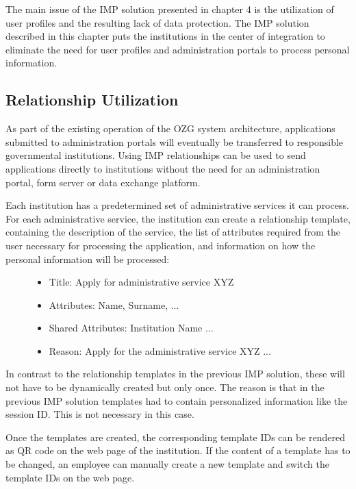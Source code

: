 The main issue of the IMP solution presented in chapter 4 is the utilization of user profiles and the resulting lack of data protection. The IMP solution described in this chapter puts the institutions in the center of integration to eliminate the need for user profiles and administration portals to process personal information.

\subsection{Relationship Utilization}

As part of the existing operation of the OZG system architecture, applications submitted to administration portals will eventually be transferred to responsible governmental institutions. Using IMP relationships can be used to send applications directly to institutions without the need for an administration portal, form server or data exchange platform.

Each institution has a predetermined set of administrative services it can process. For each administrative service, the institution can create a relationship template, containing the description of the service, the list of attributes required from the user necessary for processing the application, and information on how the personal information will be processed:

\begin{figure}[H]
\begin{itemize}
    \item Title: Apply for administrative service XYZ
    \item Attributes: Name, Surname, ... 
    \item Shared Attributes: Institution Name ...
    \item Reason: Apply for the administrative service XYZ ...
\end{itemize}
\end{figure}

In contrast to the relationship templates in the previous IMP solution, these will not have to be dynamically created but only once. The reason is that in the previous IMP solution templates had to contain personalized information like the session ID. This is not necessary in this case.

Once the templates are created, the corresponding template IDs can be rendered as QR code on the web page of the institution. If the content of a template has to be changed, an employee can manually create a new template and switch the template IDs on the web page.

